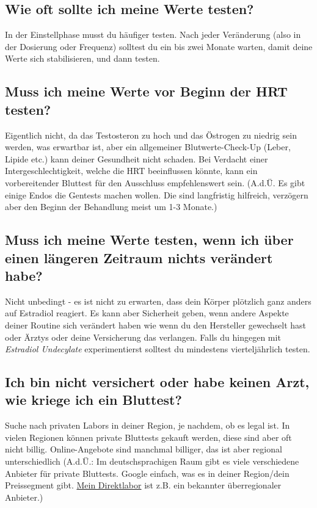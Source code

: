 \documentclass{article}
\begin{document}
\subsection{Wie oft sollte ich meine Werte testen?}

In der Einstellphase musst du häufiger testen. Nach jeder Veränderung (also in der Dosierung oder Frequenz) solltest du ein bis zwei Monate warten, damit deine Werte sich stabilisieren, und dann testen.

\subsection{Muss ich meine Werte vor Beginn der HRT testen?}

Eigentlich nicht, da das Testosteron zu hoch und das Östrogen zu niedrig sein werden, was erwartbar ist, aber ein allgemeiner Blutwerte-Check-Up (Leber, Lipide etc.) kann deiner Gesundheit nicht schaden. Bei Verdacht einer Intergeschlechtigkeit, welche die HRT beeinflussen könnte, kann ein vorbereitender Bluttest für den Ausschluss empfehlenswert sein. (A.d.Ü. Es gibt einige Endos die Gentests machen wollen. Die sind langfristig hilfreich, verzögern aber den Beginn der Behandlung meist um 1-3 Monate.)

\subsection{Muss ich meine Werte testen, wenn ich über einen längeren Zeitraum nichts verändert habe?}

Nicht unbedingt - es ist nicht zu erwarten, dass dein Körper plötzlich ganz anders auf Estradiol reagiert. Es kann aber Sicherheit geben, wenn andere Aspekte deiner Routine sich verändert haben wie wenn du den Hersteller gewechselt hast oder Ärztys oder deine Versicherung das verlangen. Falls du hingegen mit \textit{Estradiol Undecylate} experimentierst solltest du mindestens vierteljährlich testen.

\subsection{Ich bin nicht versichert oder habe keinen Arzt, wie kriege ich ein Bluttest?}

Suche nach privaten Labors in deiner Region, je nachdem, ob es legal ist. In vielen Regionen können private Bluttests gekauft werden, diese sind aber oft nicht billig. Online-Angebote sind manchmal billiger, das ist aber regional unterschiedlich (A.d.Ü.: Im deutschsprachigen Raum gibt es viele verschiedene Anbieter für private Bluttests. Google einfach, was es in deiner Region/dein Preissegment gibt. \href{https://www.meindirektlabor.de/}{Mein Direktlabor} ist z.B. ein bekannter überregionaler Anbieter.)
\end{document}
